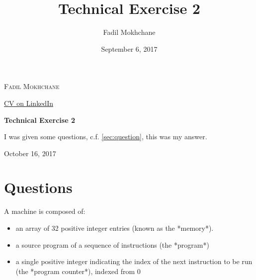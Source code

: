 \documentclass[12pt,a4paper,titlepage]{article}
\title{Technical Exercise 2}
\author{Fadil Mokhchane}
\date{September 6, 2017} %
\begin{document}
\begin{titlepage}
	\centering

	{\scshape\LARGE Fadil Mokhchane \par}
	{\small \href{https://www.linkedin.com/in/fadil/}{CV on LinkedIn} }\par
	\vspace{1cm}

	\vspace{3.5cm}
	{\huge\bfseries Technical Exercise 2\par}
	\vfill
	{I was given some questions, c.f. \autoref{sec:question},
	this was my answer.}
	\vfill

	{%
	\large October 16, 2017\par}
\end{titlepage}

\newpage
\tableofcontents
{}
%
%
%    	
%    	
%    	
%    	
%    	

\newpage
\listoffigures
\listoftables
\vfill
\newpage


\section{Questions} \label{sec:question}
A machine is composed of:
\begin{itemize}
	\item an array of 32 positive integer entries (known as the *memory*).
	\item a source program of a sequence of instructions (the *program*)
	\item a single positive integer indicating the index of the next instruction to 
		be run (the *program counter*), indexed from 0
\end{itemize}
\end{document}
